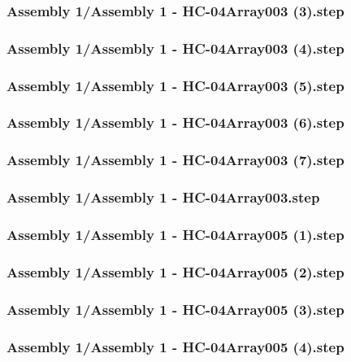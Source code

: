 \documentclass[a4paper,12pt]{article}
\begin{document}
\subsubsection{Assembly 1/Assembly 1 - HC-04Array003 (3).step}

\subsubsection{Assembly 1/Assembly 1 - HC-04Array003 (4).step}

\subsubsection{Assembly 1/Assembly 1 - HC-04Array003 (5).step}

\subsubsection{Assembly 1/Assembly 1 - HC-04Array003 (6).step}

\subsubsection{Assembly 1/Assembly 1 - HC-04Array003 (7).step}

\subsubsection{Assembly 1/Assembly 1 - HC-04Array003.step}

\subsubsection{Assembly 1/Assembly 1 - HC-04Array005 (1).step}

\subsubsection{Assembly 1/Assembly 1 - HC-04Array005 (2).step}

\subsubsection{Assembly 1/Assembly 1 - HC-04Array005 (3).step}

\subsubsection{Assembly 1/Assembly 1 - HC-04Array005 (4).step}

\end{document}
